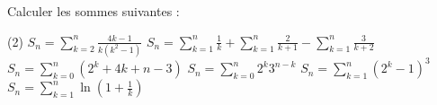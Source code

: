%
%
Calculer les sommes suivantes :
	\begin{tasks}(2)
		\task $S_n = \sum\limits_{k=2}^n \frac{4k-1}{k(k^2-1)}$
		\task $S_n = \sum\limits_{k=1}^n \frac{1}{k} + \sum\limits_{k=1}^n\frac{2}{k+1} - \sum\limits_{k=1}^n\frac{3}{k+2}$
		\task $S_n = \sum\limits_{k=0}^n (2^k + 4k +n -3)$
	    \task $S_n = \sum\limits_{k=0}^n 2^k3^{n-k}$
	    \task $S_n = \sum\limits_{k=1}^n (2^k-1)^3$
	     \task $S_n = \sum\limits_{k=1}^n \ln (1 + \frac{1}{k})$
	\end{tasks}
